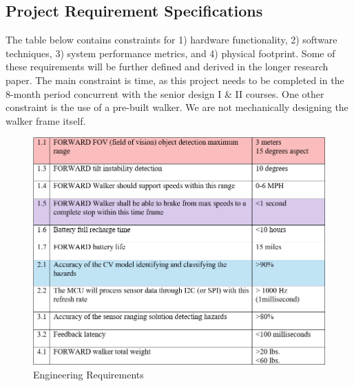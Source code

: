 \subsection{Project Requirement Specifications}
\noindent The table below contains constraints for 1) hardware functionality, 2) software techniques, 3) system performance metrics, and 4) physical footprint. Some of these requirements will be further defined and derived in the longer research paper. The main constraint is time, as this project needs to be completed in the 8-month period concurrent with the senior design I \& II courses. One other constraint is the use of a pre-built walker. We are not mechanically designing the walker frame itself.

\begin{figure}[H]
	\centering
	\includegraphics[width=0.99925\textwidth]{./Images/EngineeringReq.png}
	\caption{\label{fig:Standards}Engineering Requirements}
\end{figure}